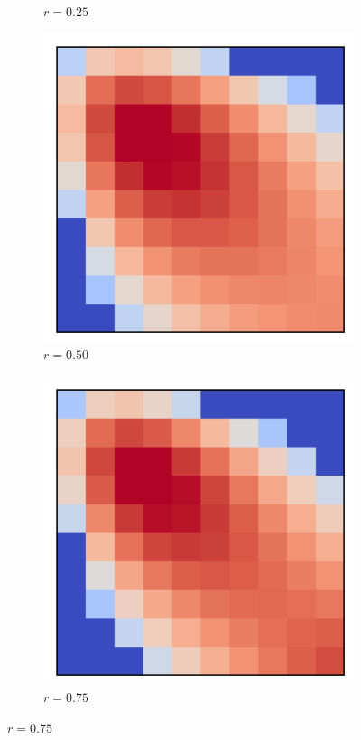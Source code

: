 \begin{figure}[bt]
\begin{subfigure}[b]{0.205\textwidth}
         \caption{$r=0.25$}
         \label{fig:rexf}
     \end{subfigure}
     \hfill
     \begin{subfigure}[b]{0.205\textwidth}
         \centering
         \includegraphics[width=\textwidth]{./figures/general_networks/assort_mat_50.pdf}
         \caption{$r=0.50$}
         \label{fig:rexg}
     \end{subfigure}
      \hfill
       \begin{subfigure}[b]{0.205\textwidth}
         \centering
         \includegraphics[width=\textwidth]{./figures/general_networks/assort_mat_75.pdf}
         \caption{$r=0.75$}
         \label{fig:rexh}
     \end{subfigure}
      \hfill
 

\end{figure}
